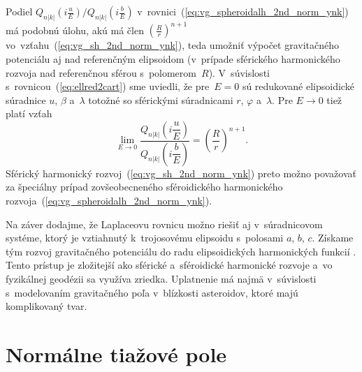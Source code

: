 \documentclass[a4paper, 12pt]{book}
\begin{document}
Podiel $Q_{n|k|}\left( i \frac{u}{E} \right) \slash Q_{n|k|}\left( 
i \frac{b}{E} \right)$ v~rovnici~(\ref{eq:vg_spheroidalh_2nd_norm_ynk}) má 
podobnú úlohu, akú má člen $\left( \frac{R}{r} \right)^{n + 1}$ 
vo~vzťahu~(\ref{eq:vg_sh_2nd_norm_ynk}), teda umožniť výpočet gravitačného 
potenciálu aj nad referenčným elipsoidom (v~prípade sférického harmonického 
rozvoja nad referenčnou sférou s~polomerom~$R$).  V~súvislosti 
s~rovnicou~(\ref{eq:ellred2cart}) sme uviedli, že pre~$E = 0$ sú redukované 
elipsoidické súradnice $u$, $\beta$ a~$\lambda$ totožné so sférickými 
súradnicami $r$, $\varphi$ a~$\lambda$.  Pre $E \rightarrow 0$ tiež platí vzťah 
\parencite{MoritzPhysicalGeodesy}
%
\begin{equation}
\lim_{E \rightarrow 0} \frac{Q_{n|k|}\left( i \dfrac{u}{E} 
\right)}{Q_{n|k|}\left( i \dfrac{b}{E} \right)} = \left( \frac{R}{r} \right)^{n 
+ 1}{.}
\end{equation}
%
Sférický harmonický rozvoj~(\ref{eq:vg_sh_2nd_norm_ynk}) preto možno považovať 
za špeciálny prípad zovšeobecneného sféroidického harmonického 
rozvoja~(\ref{eq:vg_spheroidalh_2nd_norm_ynk}).

Na záver dodajme, že Laplaceovu rovnicu možno riešiť aj v~súradnicovom systéme, 
ktorý je vztiahnutý k~trojosovému elipsoidu s~polosami $a$, $b$, $c$.  Získame 
tým rozvoj gravitačného potenciálu do radu elipsoidických harmonických funkcií 
\parencite[napríklad][]{Garmier2001,Hu2015,Reimond2016}.  Tento prístup je 
zložitejší ako sférické a~sféroidické harmonické rozvoje a~vo fyzikálnej 
geodézii sa využíva zriedka.  Uplatnenie má najmä v~súvislosti s~modelovaním 
gravitačného poľa v~blízkosti asteroidov, ktoré majú komplikovaný tvar.










\chapter{Normálne tiažové pole}
\label{sec:normal_gravity_field}
\end{document}
